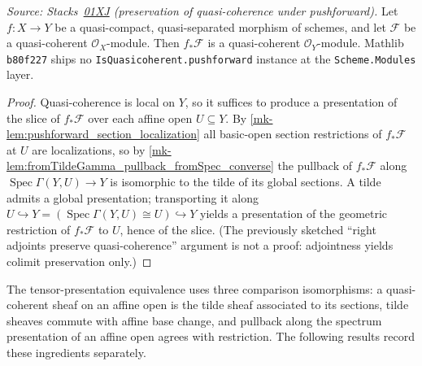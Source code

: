\begin{lemma}
  \label{mk-lem:pushforward_isQuasicoherent}
  \leanok

  \textit{Source: Stacks~\href{https://stacks.math.columbia.edu/tag/01XJ}{01XJ}
  (preservation of quasi-coherence under pushforward).}
  Let \(f : X \to Y\) be a quasi-compact, quasi-separated morphism of
  schemes, and let \(\mathcal{F}\) be a quasi-coherent
  \(\mathcal{O}_X\)-module. Then \(f_* \mathcal{F}\) is a quasi-coherent
  \(\mathcal{O}_Y\)-module. Mathlib \texttt{b80f227} ships no
  \texttt{IsQuasicoherent.pushforward} instance at the
  \texttt{Scheme.Modules} layer.
\end{lemma}
\begin{proof}
  \leanok
  Quasi-coherence is local on $Y$, so it suffices to produce a presentation
  of the slice of $f_* \mathcal{F}$ over each affine open $U \subseteq Y$.
  By \ref{mk-lem:pushforward_section_localization} all basic-open section
  restrictions of $f_* \mathcal{F}$ at $U$ are localizations, so by
  \ref{mk-lem:fromTildeGamma_pullback_fromSpec_converse} the pullback of
  $f_* \mathcal{F}$ along $\operatorname{Spec} \Gamma(Y, U) \to Y$ is
  isomorphic to the tilde of its global sections. A tilde admits a global
  presentation; transporting it along
  $U \hookrightarrow Y = (\operatorname{Spec}\Gamma(Y,U) \cong U)
  \hookrightarrow Y$ yields a presentation of the geometric restriction of
  $f_* \mathcal{F}$ to $U$, hence of the slice. (The previously sketched
  ``right adjoints preserve quasi-coherence'' argument is not a proof:
  adjointness yields colimit preservation only.)
\end{proof}


The tensor-presentation equivalence uses three comparison isomorphisms:
a quasi-coherent sheaf on an affine open is the tilde sheaf associated to
its sections, tilde sheaves commute with affine base change, and pullback
along the spectrum presentation of an affine open agrees with restriction.
The following results record these ingredients separately.

